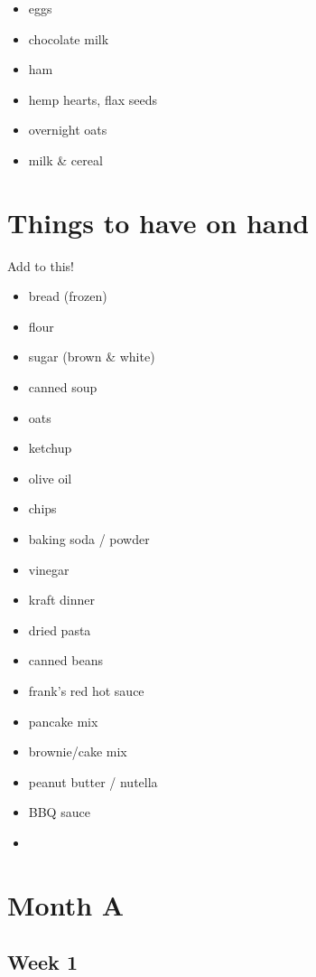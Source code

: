 \documentclass[11pt, a4paper]{article}
\begin{document}
\begin{itemize}
\item eggs
\item chocolate milk
\item ham
\item hemp hearts, flax seeds
\item overnight oats
\item milk \& cereal 
\end{itemize}

\vspace{1pc}

\section{Things to have on hand}
Add to this!

\vspace{1pc}

\begin{itemize}
\item bread (frozen)
\item flour
\item sugar (brown \& white)
\item canned soup
\item oats
\item ketchup
\item olive oil
\item chips
\item baking soda / powder
\item vinegar
\item kraft dinner
\item dried pasta
\item canned beans
\item frank's red hot sauce
\item pancake mix
\item brownie/cake mix
\item peanut butter / nutella
\item BBQ sauce
\item 
\end{itemize}

\pagebreak
\section{Month A}

\subsection{Week 1}
\end{document}
